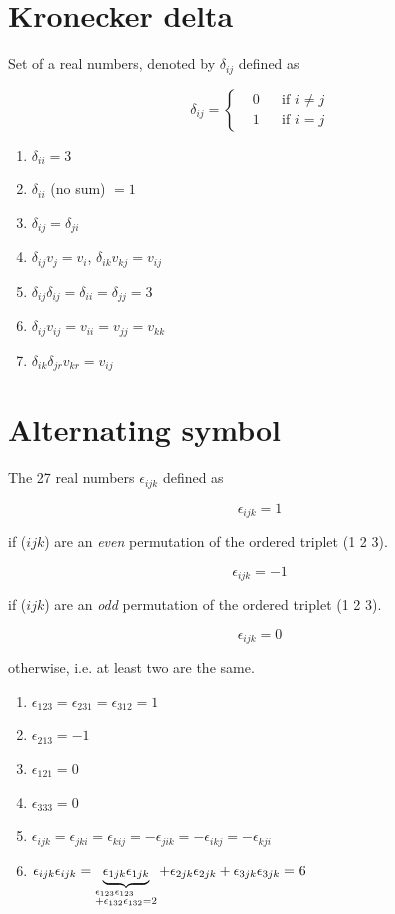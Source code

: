 \section{Kronecker delta}

Set of a real numbers, denoted by $\delta_{ij}$ defined as


\[
\delta_{ij}= 
\left\{\begin{aligned} 
& 0 & & \text{if $i \neq j$}\\
& 1 & & \text{if $i=j$}\end{aligned}\right.
\]

\begin{enumerate}[label= e.g. \arabic*)]
\item $\delta_{ii}=3$
\item $\delta_{ii}$ (no sum) $=1$
\item $\delta_{ij}=\delta_{ji}$
\item $\delta_{ij}v_{j}=v_{i}$, $\delta_{ik}v_{kj}=v_{ij}$
\item $\delta_{ij}\delta_{ij}=\delta_{ii}=\delta_{jj}=3$
\item $\delta_{ij}v_{ij}=v_{ii}=v_{jj}=v_{kk}$
\item $\delta_{ik}\delta_{jr}v_{kr}=v_{ij}$
\end{enumerate}

\section{Alternating symbol}

The 27 real numbers $\epsilon_{ijk}$ defined as 

\[\epsilon_{ijk}=1\]

if ($ijk$) are an \emph{even} permutation of the ordered triplet (1 2 3).

\[\epsilon_{ijk}=-1\]

if ($ijk$) are an \emph{odd} permutation of the ordered triplet (1 2 3).


\[\epsilon_{ijk}=0\]

otherwise, i.e. at least two are the same. 

\begin{enumerate}[label= e.g. \arabic*)]
\item $\epsilon_{123}=\epsilon_{231}=\epsilon_{312}=1$
\item $\epsilon_{213}=-1$
\item $\epsilon_{121}=0$
\item $\epsilon_{333}=0$

\item $\epsilon_{ijk}=\epsilon_{jki}=\epsilon_{kij}=-\epsilon_{jik}=-\epsilon_{ikj}=-\epsilon_{kji}$
\item $\epsilon_{ijk}\epsilon_{ijk}=\underbrace{\epsilon_{1jk}\epsilon_{1jk}}_{
\begin{subarray}{l}
  \epsilon_{123}\epsilon_{123} \\
  +\epsilon_{132}\epsilon_{132}=2
  \end{subarray}
}+\epsilon_{2jk}\epsilon_{2jk}+\epsilon_{3jk}\epsilon_{3jk}=6$


\end{enumerate}


